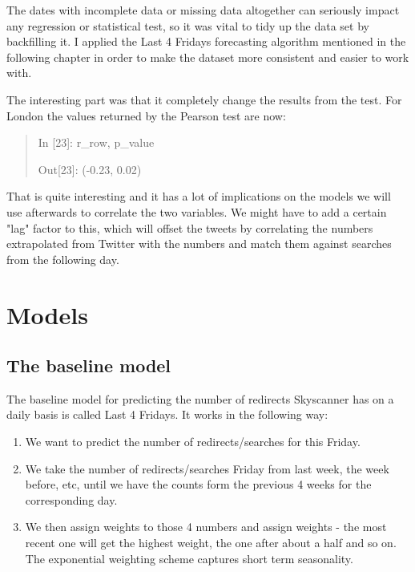 \documentclass[minf,frontabs,twoside,singlespacing,parskip]{infthesis}
\begin{document}
The dates with incomplete data or missing data altogether can seriously impact any regression or statistical test, so it was vital to tidy up the data set by backfilling it. I applied the Last 4 Fridays forecasting algorithm mentioned in the following chapter in order to make the dataset more consistent and easier to work with. 

The interesting part was that it completely change the results from the test. For London the values returned by the Pearson test are now:

\begin{quotation}
In [23]: r\_row, p\_value

Out[23]: (-0.23, 0.02)
\end{quotation}

That is quite interesting and it has a lot of implications on the models we will use afterwards to correlate the two variables. 
We might have to add a certain "lag" factor to this, which will offset the tweets by correlating the numbers extrapolated from Twitter with the numbers and match them against searches from the following day.




\chapter{Models}
\label{chap:model}

\section{The baseline model}
\label{sec:baseline}

The baseline model for predicting the number of redirects Skyscanner has on a daily basis is called Last 4 Fridays. 
It works in the following way:
\begin{enumerate}
\item We want to predict the number of redirects/searches for this Friday.
\item We take the number of redirects/searches Friday from last week, the week before, etc, until we have the counts form the previous 4 weeks for the corresponding day.
\item We then assign weights to those 4 numbers and assign weights - the most recent one will get the highest weight, the one after about a half and so on. The exponential weighting scheme captures short term seasonality.
\end{enumerate}
\end{document}
